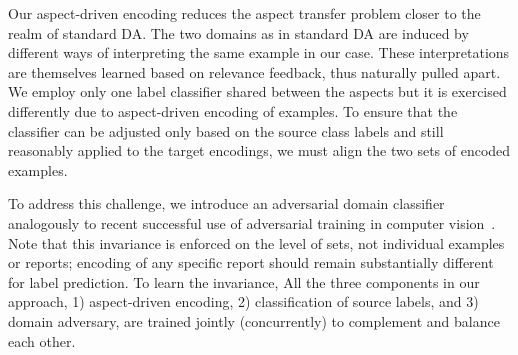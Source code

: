 Our aspect-driven encoding reduces the aspect transfer problem closer to the realm of standard DA. The two domains as in standard DA are induced by different ways of interpreting the same example in our case. These interpretations are themselves learned based on relevance feedback, thus naturally pulled apart. We employ only one label classifier shared between the aspects but it is exercised differently due to aspect-driven encoding of examples. To ensure that the classifier can be adjusted only based on the source class labels and still reasonably applied to the target encodings, we must align the two sets of encoded examples. 

To address this challenge, we introduce an adversarial domain classifier analogously to recent successful use of adversarial training in computer vision~\cite{ganin2014unsupervised}.  
Note that this invariance is enforced on the level of sets, not individual examples or reports; encoding of any specific report should remain substantially different for label prediction. To learn the invariance, All the three components in our approach, 1) aspect-driven encoding, 2) classification of source labels, and 3) domain adversary, are trained jointly (concurrently) to complement and balance each other.

